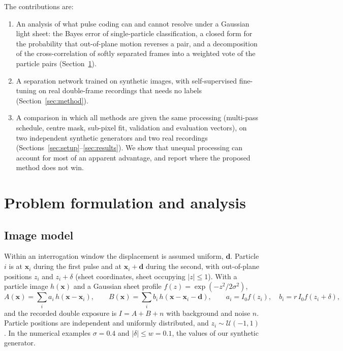 \documentclass[11pt]{article}
\theoremstyle{remark}
\newcommand{\x}{\mathbf{x}}
\newcommand{\dd}{\mathbf{d}}
\begin{document}
The contributions are:
\begin{enumerate}
\item An analysis of what pulse coding can and cannot resolve under a Gaussian light sheet: the Bayes error of single-particle classification, a closed form for the probability that out-of-plane motion reverses a pair, and a decomposition of the cross-correlation of softly separated frames into a weighted vote of the particle pairs (Section~\ref{sec:theory}).
\item A separation network trained on synthetic images, with self-supervised fine-tuning on real double-frame recordings that needs no labels (Section~\ref{sec:method}).
\item A comparison in which all methods are given the same processing (multi-pass schedule, centre mask, sub-pixel fit, validation and evaluation vectors), on two independent synthetic generators and two real recordings (Sections~\ref{sec:setup}--\ref{sec:results}).
We show that unequal processing can account for most of an apparent advantage, and report where the proposed method does not win.
\end{enumerate}

\section{Problem formulation and analysis}\label{sec:theory}

\subsection{Image model}
Within an interrogation window the displacement is assumed uniform, $\dd$.
Particle $i$ is at $\x_i$ during the first pulse and at $\x_i+\dd$ during the second, with out-of-plane positions $z_i$ and $z_i+\delta$ (sheet coordinates, sheet occupying $|z|\le1$).
With a particle image $h(\x)$ and a Gaussian sheet profile $f(z)=\exp(-z^2/2\sigma^2)$,
\begin{equation}
A(\x)=\sum_i a_i\,h(\x-\x_i),\qquad B(\x)=\sum_i b_i\,h(\x-\x_i-\dd),\qquad
a_i=I_0 f(z_i),\quad b_i=r\,I_0 f(z_i+\delta),
\label{eq:model}
\end{equation}
and the recorded double exposure is $I=A+B+n$ with background and noise $n$.
Particle positions are independent and uniformly distributed, and $z_i\sim\mathcal U(-1,1)$.
In the numerical examples $\sigma=0.4$ and $|\delta|\le w=0.1$, the values of our synthetic generator.
\end{document}

